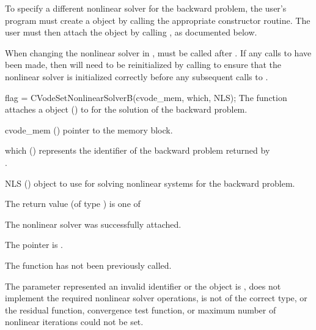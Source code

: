 To specify a different nonlinear solver for the backward problem, the user's
program must create a {\sunnonlinsol} object by calling the appropriate
constructor routine. The user must then attach the {\sunnonlinsol} object by
calling , as documented below.

When changing the nonlinear solver in {\cvodes}, 
must be called after . If any calls to  have been
made, then {\cvodes} will need to be reinitialized by calling 
to ensure that the nonlinear solver is initialized correctly before any
subsequent calls to .

{
  flag = CVodeSetNonlinearSolverB(cvode\_mem, which, NLS);
}
{
  The function  attaches a {\sunnonlinsol}
  object () to {\cvodes} for the solution of the backward problem.
}
{
  \begin{args}
  \item[cvode\_mem] ()
    pointer to the {\cvodes} memory block.
  \item[which] ()
    represents the identifier of the backward problem returned by \\ \noindent
    .
  \item[NLS] ()
    {\sunnonlinsol} object to use for solving nonlinear systems for the backward
    problem.
  \end{args}
}
{
  The return value  (of type ) is one of
  \begin{args}
  \item[\Id{CV\_SUCCESS}]
    The nonlinear solver was successfully attached.
  \item[\Id{CV\_MEM\_NULL}]
    The  pointer is .
  \item[\Id{CVLS\_NO\_ADJ}]
    The function  has not been previously called.
  \item[\Id{CV\_ILL\_INPUT}]
    The parameter  represented an invalid identifier or the
    {\sunnonlinsol} object is , does not implement the required
    nonlinear solver operations, is not of the correct type, or the residual
    function, convergence test function, or maximum number of nonlinear
    iterations could not be set.
  \end{args}
}
{}


